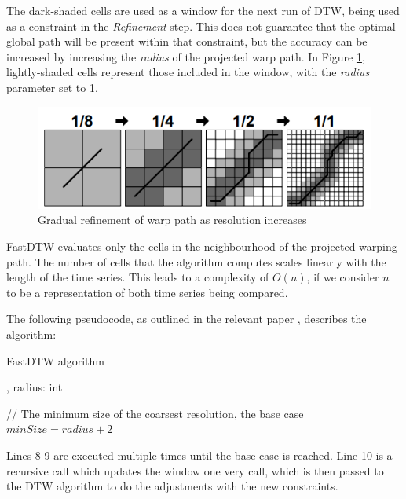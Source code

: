 \documentclass[final,rdr32.tex]{subfiles}
\begin{document}
The dark-shaded cells are used as a window for the next run of DTW, being used as a constraint in the \textit{Refinement} step. This does not guarantee that the optimal global path will be present within that constraint, but the accuracy can be increased by increasing the \textit{radius} of the projected warp path. In Figure \ref{fig:fastdtw}, lightly-shaded cells represent those included in the window, with the \textit{radius} parameter set to 1.

\begin{figure}[H]
    \begin{center}
        \includegraphics[scale=0.9]{images/fastdtw.png}
        \caption{Gradual refinement of warp path as resolution increases}
        \label{fig:fastdtw}
    \end{center}
\end{figure}

FastDTW evaluates only the cells in the neighbourhood of the projected warping path. The number of cells that the algorithm computes scales linearly with the length of the time series. This leads to a complexity of $O(n)$, if we consider $n$ to be a representation of both time series being compared.

The following pseudocode, as outlined in the relevant paper \cite{salvador2007toward}, describes the algorithm:\\

\begin{algorithm}[H]
    \caption{FastDTW algorithm}

    , radius: int \\

    // The minimum size of the coarsest resolution, the base case\\
    $minSize = radius+2$

\end{algorithm}
\bigskip
Lines 8-9 are executed multiple times until the base case is reached. Line 10 is a recursive call which updates the window one very call, which is then passed to the DTW algorithm to do the adjustments with the new constraints.
\end{document}
